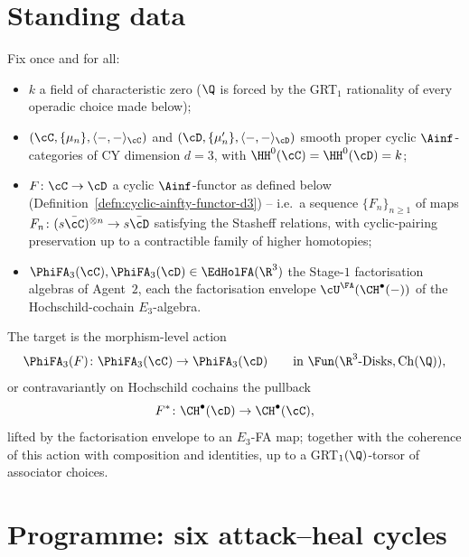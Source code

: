 \section*{Standing data}

Fix once and for all:
\begin{itemize}
\item $k$ a field of characteristic zero ($\Q$ is forced by the GRT$_1$
      rationality of every operadic choice made below);
\item $(\cC, \{\mu_n\}, \langle -, - \rangle_\cC)$ and
      $(\cD, \{\mu'_n\}, \langle -, - \rangle_\cD)$ smooth proper cyclic
      $\Ainf$-categories of CY dimension $d = 3$, with
      $\HH^0(\cC) = \HH^0(\cD) = k$;
\item $F \colon \cC \to \cD$ a cyclic $\Ainf$-functor as defined below
      (Definition~\ref{defn:cyclic-ainfty-functor-d3}) -- i.e.\ a
      sequence $\{F_n\}_{n \geq 1}$ of maps
      $F_n \colon (s\bar\cC)^{\otimes n} \to s\bar\cD$ satisfying the
      Stasheff relations, with cyclic-pairing preservation up to a
      contractible family of higher homotopies;
\item $\PhiFA_3(\cC), \PhiFA_3(\cD) \in \EdHolFA(\R^3)$ the Stage-$1$
      factorisation algebras of Agent~$2$, each the factorisation
      envelope $\cU^{\FA}(\CH^\bullet(-))$ of the Hochschild-cochain
      $E_3$-algebra.
\end{itemize}

The target is the morphism-level action
\[
  \PhiFA_3(F) \colon \PhiFA_3(\cC) \to \PhiFA_3(\cD)
  \qquad\text{in }\Fun(\R^3\text{-Disks},\mathrm{Ch}(\Q)),
\]
or contravariantly on Hochschild cochains the pullback
\[
  F^* \colon \CH^\bullet(\cD) \to \CH^\bullet(\cC),
\]
lifted by the factorisation envelope to an $E_3$-FA map; together with
the coherence of this action with composition and identities, up to a
GRT$_1(\Q)$-torsor of associator choices.

\section*{Programme: six attack--heal cycles}

